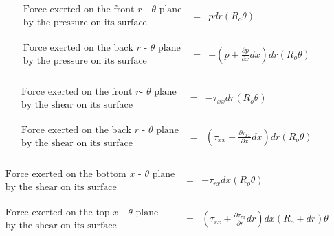 \begin{displaymath}
	\begin{array}{ccc}
		\begin{array}{c}
		\textrm{Force exerted on the front $r$ - $\theta$ plane} \\
		\textrm{by the pressure on its surface}
		\end{array} & = &
		p dr (R_o \theta) \\
	& \\ & \\
		\begin{array}{c}
		\textrm{Force exerted on the back $r$ - $\theta$ plane}\\
		\textrm{by the pressure on its surface}
		\end{array} & = &
		-(p + \frac{\partial p}{\partial x}dx) dr (R_o \theta) 
	\end{array} 
\end{displaymath}
\\
\begin{displaymath}
	\begin{array}{ccc}
		\begin{array}{c}
		\textrm{Force exerted on the front $r$- $\theta$ plane} \\
		\textrm{by the shear on its surface}
		\end{array} & = &
		- \tau_{xx}dr (R_o \theta) \\
   	& \\ & \\
		\begin{array}{c}
		\textrm{Force exerted on the back $r$ - $\theta$ plane}\\
		\textrm{by the shear on its surface}
		\end{array} & = &
		(\tau_{xx} + \frac{\partial \tau_{xx}}{\partial x}dx) dr (R_o \theta) 
	\end{array}
\end{displaymath}
\\
\begin{displaymath}
	\begin{array}{ccc}
		\begin{array}{c}
		\textrm{Force exerted on the bottom $x$ - $\theta$ plane}\\
		\textrm{by the shear on its surface}
		\end{array} & = &
		- \tau_{rx}dx(R_o \theta) \\
	& \\ & \\
		\begin{array}{c}
		\textrm{Force exerted on the top $x$ - $\theta$ plane} \\
		\textrm{by the shear on its surface}
		\end{array} & = &
		(\tau_{rx} + \frac{\partial \tau_{rx}}{\partial r}dr)dx(R_o + dr)\theta
	\end{array} 
\end{displaymath}

